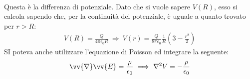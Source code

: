 \documentclass[a4paper, oneside]{article}
\begin{document}
\begin{example}
\begin{gather*}
    \end{gather*}
    Questa è la differenza di potenziale. Dato che si vuole sapere $V(R)$, esso si calcola
    sapendo che, per la continuità del potenziale, è uguale a quanto trovato per $r >R$: 
    \begin{gather*}
        V(R) = \frac{Q}{4\pi\epsilon_0 R} \ \Longrightarrow \ V(r) = \frac{Q}{8\pi\epsilon_0} \frac{1}{R}\left(3 - \frac{r^{2}}{2}\right)
    \end{gather*}
    SI poteva anche utilizzare l'equazione di Poisson ed integrare la seguente:
    \begin{gather*}
        \vv{\nabla}\vv{E} = \frac{\rho}{\epsilon_0} \ \Longrightarrow \ \nabla^{2}V = - \frac{\rho}{\epsilon_0}  
    \end{gather*}
\end{example}
\end{document}
